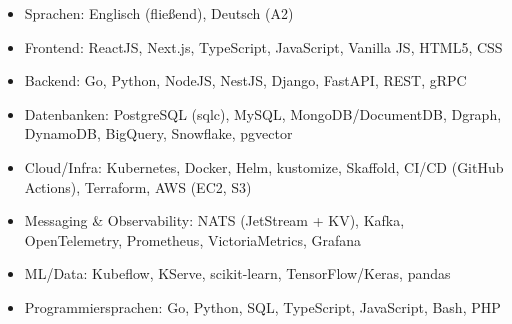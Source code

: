 \documentclass[10pt,a4paper]{resume}
\begin{document}
\begin{itemize}[leftmargin=1.4em,nosep,topsep=2pt]
  \item Sprachen: Englisch (fließend), Deutsch (A2)
  \item Frontend: ReactJS, Next.js, TypeScript, JavaScript, Vanilla JS, HTML5, CSS
  \item Backend: Go, Python, NodeJS, NestJS, Django, FastAPI, REST, gRPC
  \item Datenbanken: PostgreSQL (sqlc), MySQL, MongoDB/DocumentDB, Dgraph, DynamoDB, BigQuery, Snowflake, pgvector
  \item Cloud/Infra: Kubernetes, Docker, Helm, kustomize, Skaffold, CI/CD (GitHub Actions), Terraform, AWS (EC2, S3)
  \item Messaging \& Observability: NATS (JetStream + KV), Kafka, OpenTelemetry, Prometheus, VictoriaMetrics, Grafana
  \item ML/Data: Kubeflow, KServe, scikit-learn, TensorFlow/Keras, pandas
  \item Programmiersprachen: Go, Python, SQL, TypeScript, JavaScript, Bash, PHP
\end{itemize}
\end{document}
